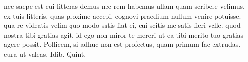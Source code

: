 


nec saepe est cui litteras demus nec rem habemus ullam quam scribere velimus. ex tuis litteris, quas proxime accepi, cognovi praedium nullum venire potuisse. qua re
videatis velim quo modo satis fiat ei, cui scitis me satis fieri velle. quod nostra tibi gratias agit, id ego non miror te mereri ut ea tibi merito tuo gratias agere possit. Pollicem, si adhuc non est profectus, quam primum fac extrudas. cura ut valeas.  Idib. Quint.
